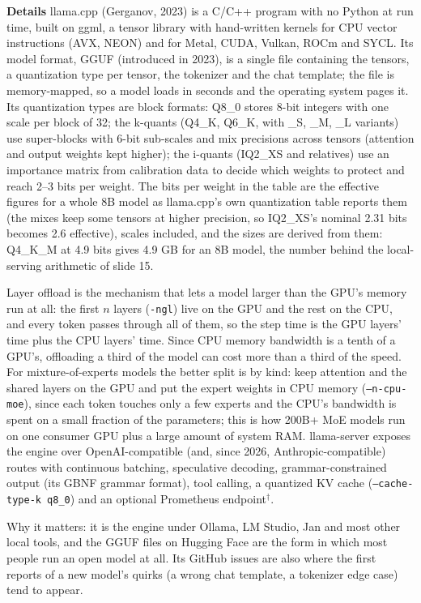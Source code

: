 \documentclass[11pt,letterpaper]{article}
\newcommand{\para}[1]{\medskip\noindent\textbf{#1}\quad}
\begin{document}
\para{Details} llama.cpp (Gerganov, 2023) is a C/C++ program with no Python at run time, built on ggml, a tensor library with hand-written kernels for CPU vector instructions (AVX, NEON) and for Metal, CUDA, Vulkan, ROCm and SYCL. Its model format, GGUF (introduced in 2023), is a single file containing the tensors, a quantization type per tensor, the tokenizer and the chat template; the file is memory-mapped, so a model loads in seconds and the operating system pages it. Its quantization types are block formats: Q8\_0 stores 8-bit integers with one scale per block of 32; the k-quants (Q4\_K, Q6\_K, with \_S, \_M, \_L variants) use super-blocks with 6-bit sub-scales and mix precisions across tensors (attention and output weights kept higher); the i-quants (IQ2\_XS and relatives) use an importance matrix from calibration data to decide which weights to protect and reach 2--3 bits per weight. The bits per weight in the table are the effective figures for a whole 8B model as llama.cpp's own quantization table reports them (the mixes keep some tensors at higher precision, so IQ2\_XS's nominal 2.31 bits becomes 2.6 effective), scales included, and the sizes are derived from them: Q4\_K\_M at 4.9 bits gives 4.9 GB for an 8B model, the number behind the local-serving arithmetic of slide 15.

Layer offload is the mechanism that lets a model larger than the GPU's memory run at all: the first $n$ layers (\texttt{-ngl}) live on the GPU and the rest on the CPU, and every token passes through all of them, so the step time is the GPU layers' time plus the CPU layers' time. Since CPU memory bandwidth is a tenth of a GPU's, offloading a third of the model can cost more than a third of the speed. For mixture-of-experts models the better split is by kind: keep attention and the shared layers on the GPU and put the expert weights in CPU memory (\texttt{--n-cpu-moe}), since each token touches only a few experts and the CPU's bandwidth is spent on a small fraction of the parameters; this is how 200B+ MoE models run on one consumer GPU plus a large amount of system RAM. llama-server exposes the engine over OpenAI-compatible (and, since 2026, Anthropic-compatible) routes with continuous batching, speculative decoding, grammar-constrained output (its GBNF grammar format), tool calling, a quantized KV cache (\texttt{--cache-type-k q8\_0}) and an optional Prometheus endpoint$^\dagger$.

Why it matters: it is the engine under Ollama, LM Studio, Jan and most other local tools, and the GGUF files on Hugging Face are the form in which most people run an open model at all. Its GitHub issues are also where the first reports of a new model's quirks (a wrong chat template, a tokenizer edge case) tend to appear.
\end{document}
